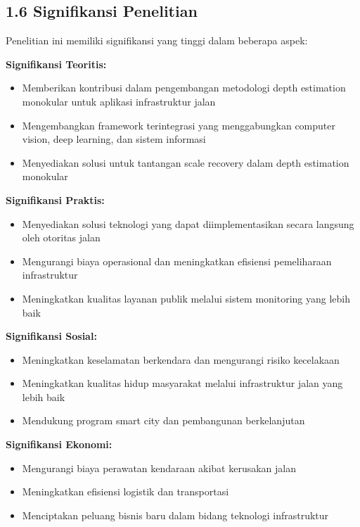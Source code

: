 \documentclass[12pt,a4paper]{article}
\begin{document}
\subsection*{1.6 Signifikansi Penelitian}
Penelitian ini memiliki signifikansi yang tinggi dalam beberapa aspek:

\textbf{Signifikansi Teoritis:}
\begin{itemize}
    \item Memberikan kontribusi dalam pengembangan metodologi depth estimation monokular untuk aplikasi infrastruktur jalan
    \item Mengembangkan framework terintegrasi yang menggabungkan computer vision, deep learning, dan sistem informasi
    \item Menyediakan solusi untuk tantangan scale recovery dalam depth estimation monokular
\end{itemize}

\textbf{Signifikansi Praktis:}
\begin{itemize}
    \item Menyediakan solusi teknologi yang dapat diimplementasikan secara langsung oleh otoritas jalan
    \item Mengurangi biaya operasional dan meningkatkan efisiensi pemeliharaan infrastruktur
    \item Meningkatkan kualitas layanan publik melalui sistem monitoring yang lebih baik
\end{itemize}

\textbf{Signifikansi Sosial:}
\begin{itemize}
    \item Meningkatkan keselamatan berkendara dan mengurangi risiko kecelakaan
    \item Meningkatkan kualitas hidup masyarakat melalui infrastruktur jalan yang lebih baik
    \item Mendukung program smart city dan pembangunan berkelanjutan
\end{itemize}

\textbf{Signifikansi Ekonomi:}
\begin{itemize}
    \item Mengurangi biaya perawatan kendaraan akibat kerusakan jalan
    \item Meningkatkan efisiensi logistik dan transportasi
    \item Menciptakan peluang bisnis baru dalam bidang teknologi infrastruktur
\end{itemize}
\end{document}

